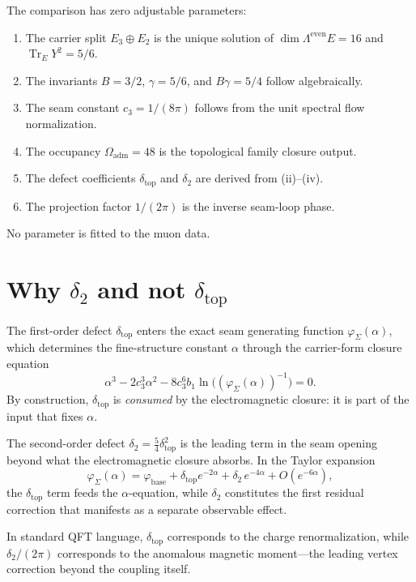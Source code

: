 \documentclass[11pt,a4paper]{article}
\theoremstyle{definition}
\theoremstyle{remark}
\DeclareMathOperator{\tr}{Tr}
\newcommand{\cthree}{c_3}
\newcommand{\bone}{b_1}
\newcommand{\phibase}{\varphi_{\mathrm{base}}}
\newcommand{\phiseam}{\varphi_{\Sigma}}
\newcommand{\deltatop}{\delta_{\mathrm{top}}}
\newcommand{\gammaY}{\gamma}
\newcommand{\Oadm}{\Omega_{\mathrm{adm}}}
\numberwithin{equation}{section}
\begin{document}
The comparison has zero adjustable parameters:

\begin{enumerate}[label=(\roman*), leftmargin=1.6em, itemsep=0.25em]
\item The carrier split $E_3\oplus E_2$ is the unique solution of
      $\dim\Lambda^{\mathrm{even}}E=16$ and $\tr_EY^2=5/6$.
\item The invariants $B=3/2$, $\gammaY=5/6$, and $B\gammaY=5/4$ follow
      algebraically.
\item The seam constant $\cthree=1/(8\pi)$ follows from the unit spectral
      flow normalization.
\item The occupancy $\Oadm=48$ is the topological family closure output.
\item The defect coefficients $\deltatop$ and $\delta_2$ are derived from
      (ii)--(iv).
\item The projection factor $1/(2\pi)$ is the inverse seam-loop phase.
\end{enumerate}

No parameter is fitted to the muon data.

\section{Why \texorpdfstring{$\delta_2$}{delta2} and not
\texorpdfstring{$\deltatop$}{delta-top}}\label{sec:why-delta2}

The first-order defect $\deltatop$ enters the exact seam generating function
$\phiseam(\alpha)$, which determines the fine-structure constant $\alpha$
through the carrier-form closure equation
\[
\alpha^3-2\cthree^3\alpha^2-8\cthree^6\bone\ln\!\bigl((\phiseam(\alpha))^{-1}\bigr)=0.
\]
By construction, $\deltatop$ is \emph{consumed} by the electromagnetic closure:
it is part of the input that fixes $\alpha$.

The second-order defect $\delta_2=\frac54\deltatop^2$ is the leading term in the
seam opening beyond what the electromagnetic closure absorbs. In the Taylor
expansion
\[
\phiseam(\alpha)
=
\phibase+\deltatop e^{-2\alpha}+\delta_2\,e^{-4\alpha}+O(e^{-6\alpha}),
\]
the $\deltatop$ term feeds the $\alpha$-equation, while $\delta_2$ constitutes
the first residual correction that manifests as a separate observable effect.

In standard QFT language, $\deltatop$ corresponds to the charge
renormalization, while $\delta_2/(2\pi)$ corresponds to the anomalous magnetic
moment---the leading vertex correction beyond the coupling itself.
\end{document}
